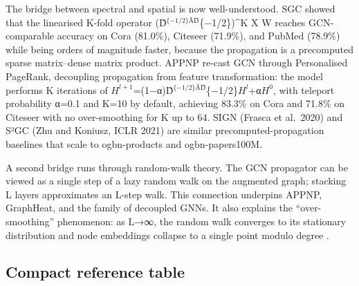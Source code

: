\documentclass{article}
\providecommand{\textsuperscript}[1]{\ensuremath{^{\text{#1}}}}
\begin{document}
The bridge between spectral and spatial is now well-understood. SGC \citep{wu2019graphwavenetfordee} showed that the linearised K-fold operator (D̃\textsuperscript{\{−1/2\}ÃD̃}\{−1/2\})\^{}K X W reaches GCN-comparable accuracy on Cora (81.0\%), Citeseer (71.9\%), and PubMed (78.9\%) while being orders of magnitude faster, because the propagation is a precomputed sparse matrix--dense matrix product. APPNP \citep{klicpera2019predictthenpropaga} re-cast GCN through Personalised PageRank, decoupling propagation from feature transformation: the model performs K iterations of \(H^{l+1}\)=(1−α)D̃\textsuperscript{\{−1/2\}ÃD̃}\{−1/2\}\(H^l\)+α\(H^0\), with teleport probability α=0.1 and K=10 by default, achieving 83.3\% on Cora and 71.8\% on Citeseer with no over-smoothing for K up to 64. SIGN (Frasca et al.~2020) and S²GC (Zhu and Koniusz, ICLR 2021) are similar precomputed-propagation baselines that scale to ogbn-products and ogbn-papers100M.

A second bridge runs through random-walk theory. The GCN propagator can be viewed as a single step of a lazy random walk on the augmented graph; stacking L layers approximates an L-step walk. This connection underpins APPNP, GraphHeat, and the family of decoupled GNNs. It also explains the ``over-smoothing'' phenomenon: as L→∞, the random walk converges to its stationary distribution and node embeddings collapse to a single point modulo degree \citep{li2018deeperinsightsinto}.

\subsection{Compact reference table}\label{compact-reference-table}
\end{document}
